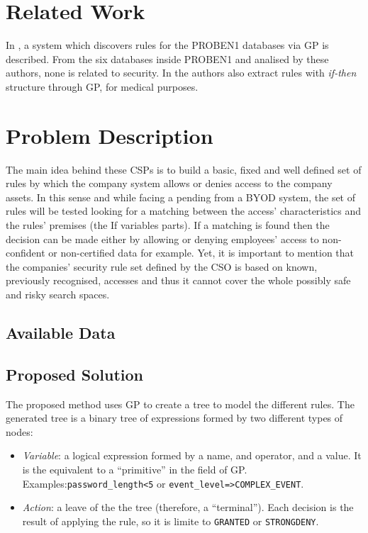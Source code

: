 \documentclass[runningheads,a4paper]{llncs}
\begin{document}
\section{Related Work}
\label{sec:SotA}


In \cite{DeFalco2002257}, a system which discovers rules for the PROBEN1 databases via GP is described. From the six databases inside PROBEN1 and analised by these authors, none is related to security.
In \cite{Tsakonas2004195} the authors also extract rules with \textit{if-then} structure through GP, for medical purposes.

\section{Problem Description}
\label{sec:problem}


The main idea
behind these CSPs is to build a basic, fixed and well defined set of
rules by which the company system allows or denies access to the
company assets. In this sense and while facing a pending %
from a BYOD 
system, the set of rules will be tested looking for a matching between
the access' characteristics and the rules' premises (the If variables
parts). If a matching is found then the decision can be made either by
allowing or denying employees' access to non-confident or
non-certified data for example. Yet, it is important to mention that
the companies' security rule set defined by the CSO is based on known, previously recognised,
accesses and thus it cannot cover the whole possibly safe and risky
search spaces. 


\subsection{Available Data}
\label{subsec:data}

\subsection{Proposed Solution}
\label{subsec:solution}

The proposed method uses GP to create a tree to model the different rules. The generated tree
is a binary tree of expressions formed by two different types of nodes:

\begin{itemize}
\item {\em Variable}: a logical expression formed by a name, and operator, and a value. It is the equivalent to a ``primitive'' in the field of GP. Examples:\texttt{password\_length<5} or \texttt{event\_level=>COMPLEX\_EVENT}.
\item {\em Action}: a leave of the the tree (therefore, a ``terminal''). Each decision is the result of applying the rule, so it is limite to \texttt{GRANTED} or \texttt{STRONGDENY}.
\end{itemize}
\end{document}
